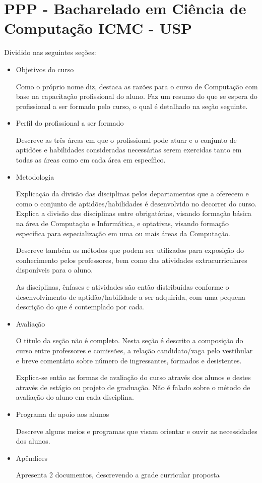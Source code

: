 \documentclass[a4paper]{article}
\begin{document}
\section{PPP - Bacharelado em Ciência de Computação ICMC - USP}

Dividido nas seguintes seções:

\begin{itemize}

\item Objetivos do curso

Como o próprio nome diz, destaca as razões para o curso de Computação com base na capacitação profissional do aluno. Faz um resumo do que se espera do profissional a ser formado pelo curso, o qual é detalhado na seção seguinte.

\item Perfil do profissional a ser formado

Descreve as três áreas em que o profissional pode atuar e o conjunto de aptidões e habilidades consideradas necessárias serem exercidas tanto em todas as áreas como em cada área em específico.

\item Metodologia

Explicação da divisão das disciplinas pelos departamentos que a oferecem e como o conjunto de aptidões/habilidades é desenvolvido no decorrer do curso. Explica a divisão das disciplinas entre obrigatórias, visando formação básica na área de Computação e Informática, e optativas, visando formação específica para especialização em uma ou mais áreas da Computação.

Descreve também os métodos que podem ser utilizados para exposição do conhecimento pelos professores, bem como das atividades extracurriculares disponíveis para o aluno. 

As disciplinas, ênfases e atividades são então distribuídas conforme o desenvolvimento de aptidão/habilidade a ser adquirida, com uma pequena descrição do que é contemplado por cada.

\item Avaliação

O titulo da seção não é completo. Nesta seção é descrito a composição do curso entre professores e comissões, a relação candidato/vaga pelo vestibular e breve comentário sobre número de ingressantes, formados e desistentes.

Explica-se então as formas de avaliação do curso através dos alunos e destes através de estágio ou projeto de graduação. Não é falado sobre o método de avaliação do aluno em cada disciplina.

\item Programa de apoio aos alunos

Descreve alguns meios e programas que visam orientar e ouvir as necessidades dos alunos.

\item Apêndices

Apresenta 2 documentos, descrevendo a grade curricular proposta

\end{itemize}
\end{document}
